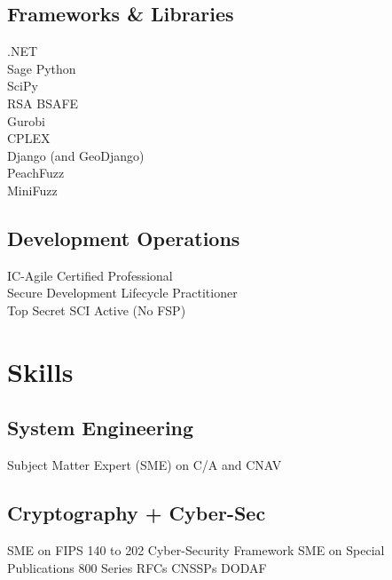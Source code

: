 \documentclass[letterpaper]{clinton-resume}
\begin{document}
\begin{minipage}[t]{0.33\textwidth}
\sectionspace %

\subsection{Frameworks \& Libraries}
.NET\\
Sage Python\\
SciPy\\
RSA BSAFE\\
Gurobi\\
CPLEX\\
Django (and GeoDjango)\\
PeachFuzz\\
MiniFuzz\\
\sectionspace %
\subsection{Development Operations}
IC-Agile Certified Professional\\
Secure Development Lifecycle Practitioner\\
Top Secret SCI Active (No FSP)\\
\sectionspace %
\section{Skills}
\subsection{System Engineering}
Subject Matter Expert (SME) on C/A and CNAV
\subsection{Cryptography + Cyber-Sec}
SME on FIPS 140 to 202\textbullet{} Cyber-Security Framework \textbullet{} SME on Special Publications 800 Series \textbullet{} RFCs \textbullet{} CNSSPs \textbullet{} DODAF\\
\end{minipage}
\end{document}
